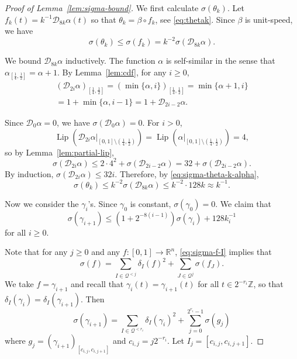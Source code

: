 \documentclass[12pt,reqno]{amsart}
\newcommand{\cQ}{\mathcal{Q}}
\newcommand{\cD}{\mathcal{D}}
\DeclareMathOperator{\Lip}{Lip}
\newcommand{\R}{\mathbb{R}}
\newcommand{\Z}{\mathbb{Z}}
\newcommand{\from}{\colon}
\theoremstyle{remark}
\newcommand{\0}{\mathbf{0}}
\renewcommand{\1}{\mathbf 1}
\begin{document}
\begin{proof}[Proof of Lemma~\ref{lem:sigma-bound}]
  We first calculate $\sigma(\theta_k)$. Let $f_k(t) = k^{-1} \cD_{8k}\alpha(t)$ so that $\theta_k = \beta\circ f_k$, see \eqref{eq:thetak}. Since $\beta$ is unit-speed, we have
  \begin{equation}\label{eq:sigma-theta-k-alpha}
    \sigma(\theta_k) \le \sigma(f_k) = k^{-2} \sigma(\cD_{8k}\alpha).
  \end{equation}

  We bound $\cD_{8k}\alpha$ inductively. The function $\alpha$ is self-similar in the sense that $\alpha_{[\frac{1}{4},\frac{1}{2}]} = \alpha + 1$. By Lemma~\ref{lem:cdf}, for any $i\ge 0$, 
  \begin{multline*}
    (\cD_{2i}\alpha)_{[\frac{1}{4},\frac{1}{2}]} 
    = (\min\{\alpha,i\})_{[\frac{1}{4},\frac{1}{2}]} 
    = \min\{\alpha + 1,i\} \\ 
    = 1 + \min\{\alpha,i-1\} 
    = 1 + \cD_{2i-2}\alpha.
  \end{multline*}

  Since $\cD_{0}\alpha=0$, we have $\sigma(\cD_{0}\alpha) = 0$. For $i>0$,
  $$\Lip(\cD_{2i} \alpha|_{[0,1]\setminus (\frac{1}{4},\frac{1}{2})}) = \Lip(\alpha|_{[0,1]\setminus (\frac{1}{4},\frac{1}{2})}) = 4,$$
  so by Lemma~\ref{lem:partial-lip},
  $$\sigma(\cD_{2i}\alpha) \le 2\cdot 4^2 + \sigma(\cD_{2i-2}\alpha) = 32 + \sigma(\cD_{2i-2}\alpha).$$
  By induction, $\sigma(\cD_{2i}\alpha) \le 32i$. Therefore, by \eqref{eq:sigma-theta-k-alpha},
  \begin{equation}\label{eq:sigma-theta-k}
    \sigma(\theta_k)\le k^{-2} \sigma(\cD_{8k}\alpha) \le k^{-2}\cdot 128k \approx k^{-1}.
  \end{equation}

  Now we consider the $\gamma_i$'s. Since $\gamma_0$ is constant, $\sigma(\gamma_0)=0$. We claim that
  \begin{equation}\label{eq:sigma-gamma-induct}
    \sigma(\gamma_{i+1}) \le (1+2^{-8(i-1)})\sigma(\gamma_i) + 128k_i^{-1}
  \end{equation}
  for all $i\ge 0$.

  Note that for any $j\ge 0$ and any $f\from [0,1]\to \R^n$, \eqref{eq:sigma-f-I} implies that
  \begin{equation}\label{eq:sigma-f-part}
    \sigma(f) = \sum_{I\in \cQ^{<j}} \delta_I(f)^2 + \sum_{J\in \cQ^j} \sigma(f_J).
  \end{equation}
  We take $f=\gamma_{i+1}$ and recall that $\gamma_i(t) = \gamma_{i+1}(t)$ for all $t\in 2^{-r_i}\Z$, so that $\delta_I(\gamma_{i}) = \delta_I(\gamma_{i+1})$. Then 
  \begin{equation}\label{eq:sigma-gamma-i+1}
    \sigma(\gamma_{i+1}) = \sum_{I\in \cQ^{< r_i}} \delta_I(\gamma_{i})^2 + \sum_{j=0}^{2^{r_i}-1} \sigma(g_j)
  \end{equation}
  where $g_j = (\gamma_{i+1})_{[c_{i,j}, c_{i,j+1}]}$ and $c_{i,j} = j2^{-r_i}$. Let $I_j = [c_{i,j}, c_{i,j+1}]$.
  

\end{proof}
\end{document}
